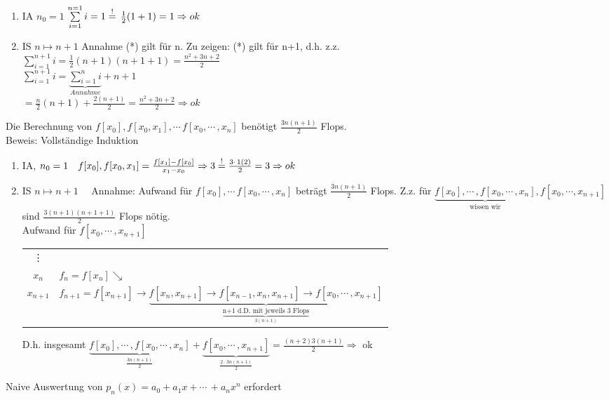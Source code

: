 \begin{enumerate}
	\item IA $n_0=1$ $\sum\limits_{i=1}^{n=1}{i}=1\overset{!}{=}\,\frac{1}{2}(1+1)=1 \Rightarrow ok$
	\item IS $n \mapsto n+1$ Annahme (*) gilt für n. Zu zeigen: (*) gilt für n+1, d.h. z.z.\\
	$\sum\limits_{i=1}^{n+1}{i}=\frac{1}{2}(n+1)(n+1+1)=\frac{n^2+3n+2}{2}$\\
	$\sum\limits_{i=1}^{n+1}{i}=\underbrace{\sum\limits_{i=1}^{n}{i}}_{Annahme} + n+1$ \\
	$=\frac{n}{2}(n+1) + \frac{2(n+1)}{2}= \frac{n^2+3n+2}{2} \Rightarrow ok$
\end{enumerate}

Die Berechnung von $f[x_0], f[x_0,x_1],\cdots\,f[x_0,\cdots\,,x_n]$ benötigt $\frac{3n(n+1)}{2}$ Flops. \\
Beweis: Vollständige Induktion\\

\begin{enumerate}
	\item IA, $n_0=1 \quad f[x_0],f[x_0,x_1]=\frac{f[x_1]-f[x_0]}{x_1-x_0} \Rightarrow 3 \overset{!}{=} \frac{3\cdot\,1(2)}{2}=3 \Rightarrow ok$
	\item IS $n \mapsto n+1 \quad$ Annahme: Aufwand für $f[x_0], \cdots\,f[x_0,\cdots\,,x_n]$ beträgt $\frac{3n(n+1)}{2}$ Flops. Z.z. für $\underbrace{f[x_0], \cdots\,,f[x_0,\cdots\,,x_n]}_{\text{wissen wir}},f[x_0,\cdots,x_{n+1}]$ sind $\frac{3(n+1)(n+1+1)}{2}$ Flops nötig. \\
Aufwand für $f[x_0,\cdots\,,x_{n+1}]$\\
\begin{tabular}{c|l}
\vdots \\
$x_{n}$ & $f_{n} = f[x_{n}] \searrow$\\
$x_{n+1}$ & $f_{n+1} = f[x_{n+1}] \rightarrow \underbrace{f[x_n,x_{n+1}] \rightarrow f[x_{n-1},x_n,x_{n+1}] \rightarrow f[x_0,\cdots\,,x_{n+1}]}_{\underbrace{\text{n+1 d.D. mit jeweils 3 Flops}}_{3(n+1)}}$ 
\end{tabular}

D.h. insgesamt $\underbrace{f[x_0],\cdots\,,f[x_0,\cdots\,,x_n]}_{\frac{3n(n+1)}{2}} + \underbrace{f[x_0,\cdots\,,x_{n+1}]}_{\frac{2\cdot\,3n(n+1)}{2}} = \frac{(n+2)3(n+1)}{2} \Rightarrow $ ok
\end{enumerate}

Naive Auswertung von $p_n(x) = a_0+a_1x+\cdots\,+a_nx^n$ erfordert 

